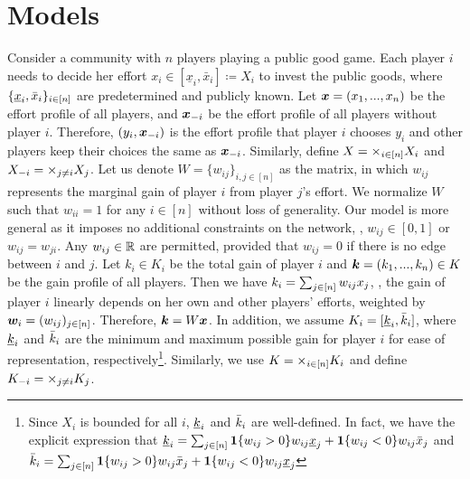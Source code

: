 \section{Models}
\label{sec:model}


Consider a community with $n$ players playing a public good game.
Each player $i$ needs to decide her effort $x_i \in [\underline{x}_i, \bar{x}_i] \coloneqq X_i$ to invest the public goods, where $\{\underline{x}_i, \bar{x}_i\}_{i\in[n]}$ are predetermined and publicly known. 
Let ${\bm{x}} = (x_1,...,x_n)$ be the effort profile of all players, and ${\bm{x}}_{-i}$ be the effort profile of all players without player $i$. 
Therefore, $(y_i,{\bm{x}}_{-i})$ is the effort profile that player $i$ chooses $y_i$ and other players keep their choices the same as ${\bm{x}}_{-i}$.
Similarly, define $X = \times_{i\in[n]} X_i$ and $X_{-i} = \times_{j\ne i} X_j$.
Let us denote $W=\{w_{ij}\}_{i,j\in [n]}$
as the matrix, in which $w_{ij}$ represents the marginal gain of player $i$
from player $j$'s effort. We normalize $W$
such that $w_{ii}=1$ for any $i\in [n]$
without loss of generality. Our model is more general as it imposes no additional constraints on the network, \eg, $w_{ij}\in [0,1]$ or $w_{ij} = w_{ji}$. 
Any $w_{ij}\in \mathbb{R}$ are permitted, provided that $w_{ij}=0$ if there is no edge between $i$ and $j$.
Let $k_i\in K_i$ be the total gain of player $i$ and ${\bm{k}} = (k_1,...,k_n) \in K$ be the gain profile of all players. Then we have $k_i = \sum_{j\in[n]} w_{ij} x_j$, \ie, the gain of player $i$ linearly depends on her own and other players' efforts, weighted by ${\bm{w}}_{i}=(w_{ij})_{j\in [n]}$. Therefore, ${\bm{k}} = W {\bm{x}}$. 
In addition, we assume $K_i = [\underline{k}_i, \bar{k}_i]$, where $\underline{k}_i$ and $\bar{k}_i$ are the minimum and maximum possible gain for player $i$ for ease of representation, respectively\footnote{Since $X_i$ is bounded for all $i$, $\underline{k}_i$ and $\bar{k}_i$ are well-defined. In fact, we have the explicit expression that $\underline{k}_i = \sum_{j\in[n]} \bm{1}\{w_{ij} > 0 \} w_{ij}\underline{x}_j + \bm{1}\{w_{ij} < 0 \} w_{ij} \bar{x}_j$ and $\bar{k}_i = \sum_{j\in[n]} \bm{1}\{w_{ij} > 0 \} w_{ij} \bar{x}_j + \bm{1}\{w_{ij} < 0 \} w_{ij} \underline{x}_j$}.
Similarly, we use $K = \times_{i\in[n]} K_i$ and define $K_{-i} = \times_{j\ne i} K_j$.


